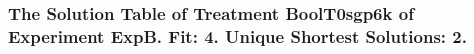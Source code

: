  \begin{frame}
 \fontsize{8pt}{9pt}\selectfont
 \frametitle{ The Solution Table of Treatment BoolT0sgp6k of Experiment ExpB. Fit: 4. Unique Shortest Solutions: 2. }

 \label{ExpBSolutionTable004.tex}  
 \end{frame}

